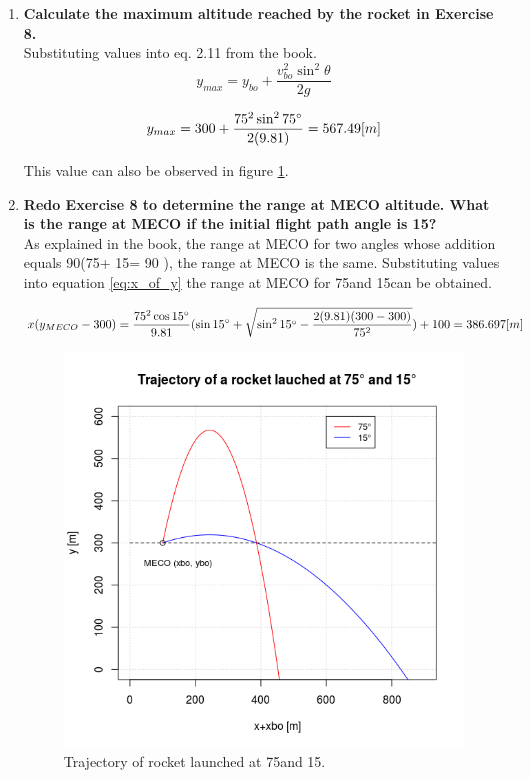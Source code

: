 \begin{enumerate}
	\item {\bf Calculate the maximum altitude reached by the rocket in Exercise 8.}\\
	
Substituting values into eq. 2.11 from the book. \\

\begin{equation}
	y_{max}  =  y_{bo} + \frac{v_{bo}^2 \sin^2\theta}{2g}
\end{equation}

\begin{equation}
	y_{max}  =  300 + \frac{75^2 \sin^2 75\degree}{2(9.81)} = 567.49 [m]
\end{equation}	

This value can also be observed in figure \ref{fig:exercises_8_9_10}.

	\item {\bf Redo Exercise 8 to determine the range at MECO altitude. What is the range at MECO if the initial flight path angle is 15\degree ?}\\
	
As explained in the book, the range at MECO for two angles whose addition equals 90\degree (75\degree + 15\degree = 90 \degree), the range at MECO is the same. Substituting values into equation \ref{eq:x_of_y} the range at MECO for 75\degree and 15\degree can be obtained.

\begin{equation}
	x(y_{MECO}-300)  = \frac{75^2 \cos15\degree}{9.81}(\sin15\degree + \sqrt{\sin^2 15\degree -\frac{2(9.81)(300-300)}{75^2}})+ 100 = 386.697 [m]
\end{equation}	
	

\begin{figure}[h!]
	\centering
	\includegraphics[width=1\textwidth]{exercises_8_9_10.png}
	\caption{Trajectory of rocket launched at 75\degree and 15\degree .}
	\label{fig:exercises_8_9_10}
\end{figure}



\end{enumerate}
